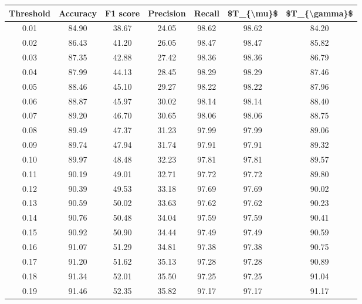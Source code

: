 \begin{tabular}{|c|c|c|c|c|c|c|}
\hline
 Threshold &  Accuracy &  F1 score &  Precision &  Recall &  \$T\_\{\textbackslash mu\}\$ &  \$T\_\{\textbackslash gamma\}\$ \\
\hline
      0.01 &     84.90 &     38.67 &      24.05 &   98.62 &      98.62 &         84.20 \\
      0.02 &     86.43 &     41.20 &      26.05 &   98.47 &      98.47 &         85.82 \\
      0.03 &     87.35 &     42.88 &      27.42 &   98.36 &      98.36 &         86.79 \\
      0.04 &     87.99 &     44.13 &      28.45 &   98.29 &      98.29 &         87.46 \\
      0.05 &     88.46 &     45.10 &      29.27 &   98.22 &      98.22 &         87.96 \\
      0.06 &     88.87 &     45.97 &      30.02 &   98.14 &      98.14 &         88.40 \\
      0.07 &     89.20 &     46.70 &      30.65 &   98.06 &      98.06 &         88.75 \\
      0.08 &     89.49 &     47.37 &      31.23 &   97.99 &      97.99 &         89.06 \\
      0.09 &     89.74 &     47.94 &      31.74 &   97.91 &      97.91 &         89.32 \\
      0.10 &     89.97 &     48.48 &      32.23 &   97.81 &      97.81 &         89.57 \\
      0.11 &     90.19 &     49.01 &      32.71 &   97.72 &      97.72 &         89.80 \\
      0.12 &     90.39 &     49.53 &      33.18 &   97.69 &      97.69 &         90.02 \\
      0.13 &     90.59 &     50.02 &      33.63 &   97.62 &      97.62 &         90.23 \\
      0.14 &     90.76 &     50.48 &      34.04 &   97.59 &      97.59 &         90.41 \\
      0.15 &     90.92 &     50.90 &      34.44 &   97.49 &      97.49 &         90.59 \\
      0.16 &     91.07 &     51.29 &      34.81 &   97.38 &      97.38 &         90.75 \\
      0.17 &     91.20 &     51.62 &      35.13 &   97.28 &      97.28 &         90.89 \\
      0.18 &     91.34 &     52.01 &      35.50 &   97.25 &      97.25 &         91.04 \\
      0.19 &     91.46 &     52.35 &      35.82 &   97.17 &      97.17 &         91.17 \\

\end{tabular}
